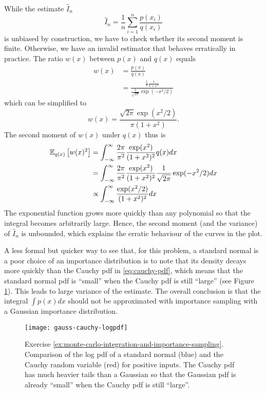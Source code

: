 \begin{solution}
  While the estimate $\hat{I}_n$
  \begin{equation}
    \hat{I}_n =  \frac{1}{n} \sum_{i=1}^n \frac{p(x_i)}{q(x_i)}
  \end{equation}
  is unbiased by construction, we have to check whether its second
  moment is finite. Otherwise, we have an invalid estimator that
  behaves erratically in practice. The ratio $w(x)$ between $p(x)$ and
  $q(x)$ equals
  \begin{align}
    w(x) & = \frac{p(x)}{q(x)}\\
    & = \frac{\frac{1}{\pi}\frac{1}{1+x^2}}{ \frac{1}{\sqrt{2\pi}}\exp(-x^2/2)}
  \end{align}
  which can be simplified to
  \begin{equation}
    w(x)  = \frac{\sqrt{2\pi}\exp(x^2/2)}{\pi(1+x^2)}.
  \end{equation}
  The second moment of $w(x)$ under $q(x)$ thus is
  \begin{align}
    \mathbb{E}_{q(x)}\left[w(x)^2\right] & = \int_{-\infty}^\infty \frac{2\pi}{\pi^2} \frac{\exp(x^2)}{(1+x^2)^2} q(x) dx\\
    & = \int_{-\infty}^\infty \frac{2\pi}{\pi^2} \frac{\exp(x^2)}{(1+x^2)^2} \frac{1}{\sqrt{2\pi}} \exp(-x^2/2) dx\\
    & \propto \int_{-\infty}^\infty \frac{\exp(x^2/2)}{(1+x^2)^2} dx
  \end{align}
  The exponential function grows more quickly than any polynomial so
  that the integral becomes arbitrarily large. Hence, the second
  moment (and the variance) of $\hat{I}_n$ is unbounded, which
  explains the erratic behaviour of the curves in the plot.

  A less formal but quicker way to see that, for this problem, a
  standard normal is a poor choice of an importance distribution is to
  note that its density decays more quickly than the Cauchy pdf in
  \eqref{eq:cauchy-pdf}, which means that the standard normal pdf is
  ``small'' when the Cauchy pdf is still ``large'' (see Figure
  \ref{fig:gauss-cauchy-logpdf}). This leads to large variance of the
  estimate. The overall conclusion is that the integral $\int p(x) dx$
  should not be approximated with importance sampling with a Gaussian
  importance distribution.

  \begin{figure}[h!]
    \centering
    \texttt{[image: gauss-cauchy-logpdf]}
    \caption{\label{fig:gauss-cauchy-logpdf} Exercise
      \ref{ex:monte-carlo-integration-and-importance-sampling}. Comparison
      of the log pdf of a standard normal (blue) and the Cauchy random
      variable (red) for positive inputs. The Cauchy pdf has much
      heavier tails than a Gaussian so that the Gaussian pdf is
      already ``small'' when the Cauchy pdf is still ``large''.}
  \end{figure}
\end{solution}


